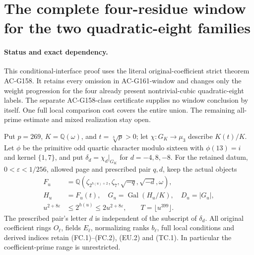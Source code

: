 \section{The complete four-residue window for the two quadratic-eight families}
\label{sec:quadratic8-quarter-actual-window}

\paragraph{Status and exact dependency.}
This conditional-interface proof uses the literal original-coefficient
strict theorem AC-G158.  It retains every omission in AC-G161-window
and changes only the weight progression for the four already present
nontrivial-cubic quadratic-eight labels.
The separate AC-G158-class certificate supplies no window conclusion
by itself.  One full local comparison cost covers the entire union.
The remaining all-prime estimate and mixed realization stay open.

Put $p=269$, $K=\mathbb Q(\omega)$, and $t=\sqrt[3]p>0$;
let $\chi:G_K\to\mu_3$ describe $K(t)/K$.
Let $\phi$ be the primitive odd quartic character modulo sixteen
with $\phi(13)=i$ and kernel $\{1,7\}$, and put
$\delta_d=\chi_d|_{G_K}$ for $d=-4,8,-8$.
For the retained datum, $0<\varepsilon<1/256$, allowed page and
prescribed pair $q,d$, keep the actual objects
\[
 \begin{aligned}
 F_u&=\mathbb Q(\zeta_{2^{h(u)+2}},\zeta_7,
                           \sqrt{-q},\sqrt{-d},\omega),\\
 H_u&=F_u(t),\quad G_u=\operatorname{Gal}(H_u/K),\quad D_u=|G_u|,\\
 u^{2+8\varepsilon}&\leq2^{h(u)}\leq2u^{2+8\varepsilon},
                         \qquad T=\lfloor u^{399}\rfloor .
 \end{aligned}
 \tag{Q8QW.1}
\]
The prescribed pair's letter $d$ is independent of the subscript
of $\delta_d$.
All original coefficient rings $O_\ell$, fields $E_\ell$,
normalizing ranks $b_\ell$, full local conditions and derived
indices retain (FC.1)--(FC.2), (EU.2) and (TC.1).
In particular the coefficient-prime range is unrestricted.

